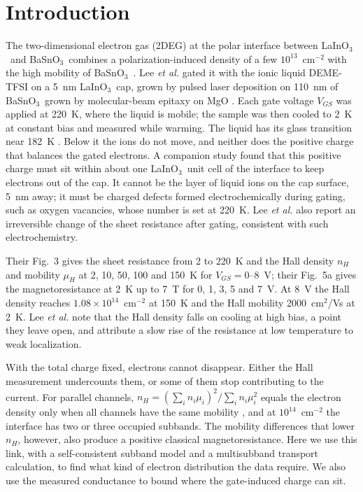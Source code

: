 \documentclass[11pt]{article}
\newcommand{\LIO}{\texorpdfstring{LaInO$_3$}{LaInO3}}
\newcommand{\BSO}{\texorpdfstring{BaSnO$_3$}{BaSnO3}}
\begin{document}
\section{Introduction}
The two-dimensional electron gas (2DEG) at the polar interface between \LIO\ and \BSO\ combines a polarization-induced density of a few $10^{13}$~cm$^{-2}$ with the high mobility of \BSO\ \cite{Kim2016LIO,Kim2019LIO,Aggoune2021}. Lee \emph{et al.} gated it with the ionic liquid DEME-TFSI on a 5~nm \LIO\ cap, grown by pulsed laser deposition on 110~nm of \BSO\ grown by molecular-beam epitaxy on MgO \cite{Lee2024LIO}. Each gate voltage $V_{GS}$ was applied at 220~K, where the liquid is mobile; the sample was then cooled to 2~K at constant bias and measured while warming. The liquid has its glass transition near 182~K \cite{McCann2015}. Below it the ions do not move, and neither does the positive charge that balances the gated electrons. A companion study \cite{OwnbyMAT02} found that this positive charge must sit within about one \LIO\ unit cell of the interface to keep electrons out of the cap. It cannot be the layer of liquid ions on the cap surface, 5~nm away; it must be charged defects formed electrochemically during gating, such as oxygen vacancies, whose number is set at 220~K. Lee \emph{et al.} also report an irreversible change of the sheet resistance after gating, consistent with such electrochemistry.

Their Fig.~3 gives the sheet resistance from 2 to 220~K and the Hall density $n_H$ and mobility $\mu_H$ at 2, 10, 50, 100 and 150~K for $V_{GS}=0$--8~V; their Fig.~5a gives the magnetoresistance at 2~K up to 7~T for 0, 1, 3, 5 and 7~V. At 8~V the Hall density reaches $1.08\times10^{14}$~cm$^{-2}$ at 150~K and the Hall mobility 2000~cm$^2$/Vs at 2~K. Lee \emph{et al.} note that the Hall density falls on cooling at high bias, a point they leave open, and attribute a slow rise of the resistance at low temperature to weak localization.

With the total charge fixed, electrons cannot disappear. Either the Hall measurement undercounts them, or some of them stop contributing to the current. For parallel channels, $n_H=(\sum_in_i\mu_i)^2/\sum_in_i\mu_i^2$ equals the electron density only when all channels have the same mobility \cite{Ziman1972}, and at $10^{14}$~cm$^{-2}$ the interface has two or three occupied subbands. The mobility differences that lower $n_H$, however, also produce a positive classical magnetoresistance. Here we use this link, with a self-consistent subband model and a multisubband transport calculation, to find what kind of electron distribution the data require. We also use the measured conductance to bound where the gate-induced charge can sit.
\end{document}
